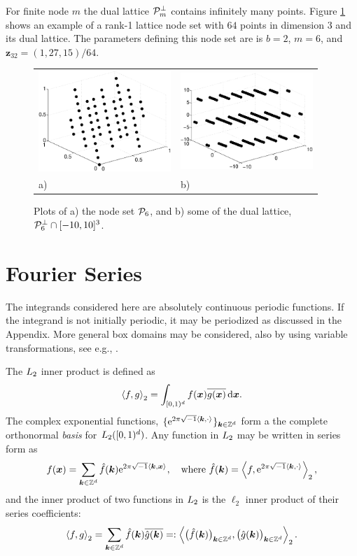 \documentclass[graybox]{svmult}
\newcommand{\Z}{\mathbb{Z}} %
\newcommand{\bsx}{\boldsymbol{x}}    %
\newcommand{\bsz}{\boldsymbol{z}}    %
\begin{document}
For finite node $m$ the dual lattice $\mathcal{P}^{\perp}_{m}$ contains infinitely many points. Figure \ref{Latticefig} shows an example of a rank-1 lattice node set with $64$ points in dimension $3$ and its dual lattice. The parameters defining this node set are is $b=2$, $m=6$, and $\bsz_{32}=(1,27,15)/64$.
\begin{figure}[h!]
\centering
\begin{tabular}{>{\centering}p{5cm}>{\centering}p{5cm}}
\includegraphics[width=5cm]{Images/Lattice64.eps} &
\includegraphics[width=5cm]{Images/DualLattice64.eps}\tabularnewline
a) & b)
\end{tabular}
\caption{Plots of a) the node set $\mathcal{P}_6$, and b) some of the dual lattice, $\mathcal{P}_6^{\perp} \cap [-10,10]^3$.}\label{Latticefig}
\end{figure}

\section{Fourier Series}\label{secfourierseries}

The integrands considered here are absolutely continuous periodic functions. If the integrand is not initially periodic, it may be periodized as discussed in the Appendix. More general box domains may be considered, also by using variable transformations, see e.g.,  \cite{HicSloWas03a,HicSloWas03e}.

The $L_2$ inner product is defined as
\[
\ip[2]{f}{g} = \int_{\cube} f(\bsx) \overline{g(\bsx)} \, \dif \bsx.
\]
The complex exponential functions, $\{\E^{2 \pi \sqrt{-1} \ip{\bsk}{\cdot}}\}_{\bsk \in \Z^d}$ form a  the complete orthonormal \emph{basis} for $L_2([0,1)^d)$.  Any function in $L_2$ may be written in series form as
\begin{equation} \label{Fourierdef}
f(\bsx) = \sum_{\bsk \in \Z^d} \hf(\bsk) \E^{2 \pi \sqrt{-1} \ip{\bsk}{\bsx}}, \quad \text{where } \hf(\bsk) = \ip[2]{f}{\E^{2 \pi \sqrt{-1} \ip{\bsk}{\cdot}}},
\end{equation}
and the inner product of two functions in $L_2$ is the $\ell_2$ inner product of their series coefficients:
\[
\ip[2]{f}{g} = \sum_{\bsk \in \Z^d} \hf(\bsk)\overline{\hg(\bsk)} =: \ip[2]{\bigl(\hf(\bsk)\bigr)_{\bsk \in \Z^d}}{\bigl ( \hg(\bsk)\bigr )_{\bsk \in \Z^d}}.
\]
\end{document}
